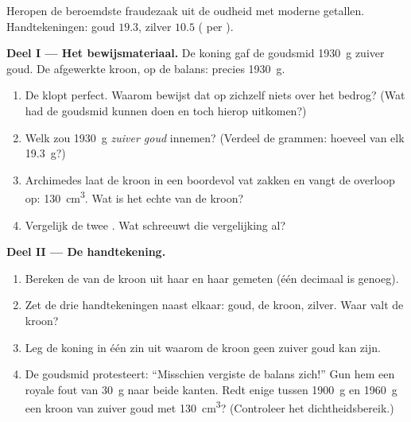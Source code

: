 \begin{problem}\label{pb:g6:density-floating:1}
Heropen de beroemdste fraudezaak uit de oudheid met moderne getallen.
Handtekeningen: goud $19.3$, zilver $10.5$ ( per
).

\medskip\noindent\textbf{Deel I --- Het bewijsmateriaal.}
De koning gaf de goudsmid \qty{1930}{g} zuiver goud. De afgewerkte
kroon, op de balans: precies \qty{1930}{g}.
\begin{enumerate}
  \item De  klopt perfect. Waarom bewijst dat op zichzelf niets
        over het bedrog? (Wat had de goudsmid kunnen doen en toch
        hierop uitkomen?)
  \item Welk  zou \qty{1930}{g} \emph{zuiver goud} innemen?
        (Verdeel de grammen: hoeveel  van elk
        \qty{19.3}{g}?)
  \item Archimedes laat de kroon in een boordevol vat zakken en vangt
        de overloop op: \qty{130}{cm^3}. Wat is het echte
         van de kroon?
  \item Vergelijk de twee . Wat schreeuwt die vergelijking al?
\end{enumerate}

\medskip\noindent\textbf{Deel II --- De handtekening.}
\begin{enumerate}[resume]
  \item Bereken de  van de kroon uit haar  en haar
        gemeten  (één decimaal is genoeg).
  \item Zet de drie handtekeningen naast elkaar: goud, de kroon,
        zilver. Waar valt de kroon?
  \item Leg de koning in één zin uit waarom de kroon geen zuiver goud
        kan zijn.
  \item De goudsmid protesteert: ``Misschien vergiste de balans
        zich!'' Gun hem een royale fout van \qty{30}{g} naar beide
        kanten. Redt enige  tussen \qty{1900}{g} en
        \qty{1960}{g} een kroon van zuiver goud met 
        \qty{130}{cm^3}? (Controleer het dichtheidsbereik.)
\end{enumerate}


\end{problem}
